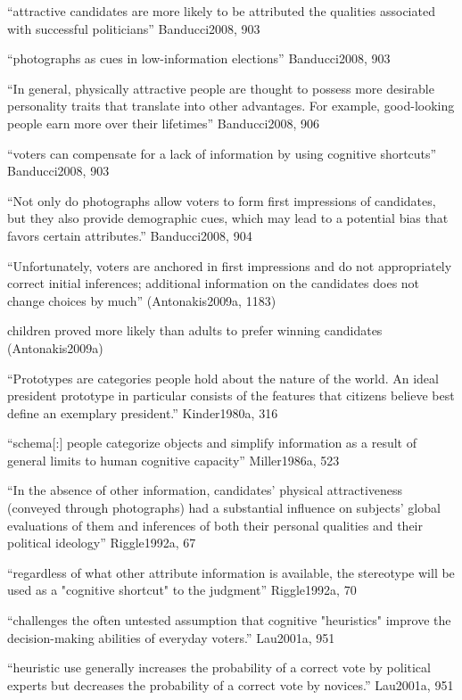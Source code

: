``attractive candidates are more likely to be attributed the qualities associated with successful politicians'' Banducci2008, 903

``photographs as cues in low-information elections'' Banducci2008, 903

``In general, physically attractive people are thought to possess more desirable
personality traits that translate into other advantages. For example, good-looking people earn more over their lifetimes'' Banducci2008, 906

``voters can compensate for a lack of information by using cognitive shortcuts'' Banducci2008, 903


	``Not only do photographs allow voters to form first impressions of candidates, but they also provide demographic cues, which may lead to a potential bias that favors certain attributes.'' Banducci2008, 904

	``Unfortunately, voters are anchored in first impressions and do not appropriately correct initial inferences; additional information on the candidates does not change choices by much'' (Antonakis2009a, 1183)

	children proved more likely than adults to prefer winning candidates (Antonakis2009a)

``Prototypes are categories people hold about the nature of the world. An ideal president prototype in particular consists of the features that citizens believe best define an exemplary president.'' Kinder1980a, 316

``schema[:] people categorize objects and simplify information as a result of general limits to human cognitive capacity'' Miller1986a, 523

``In the absence of other information, candidates' physical attractiveness (conveyed through photographs) had a substantial influence on subjects' global evaluations of them and inferences of both their personal qualities and their political ideology'' Riggle1992a, 67

``regardless of what other attribute information is available, the stereotype will be used as a "cognitive shortcut" to the judgment'' Riggle1992a, 70

``challenges the often untested assumption that cognitive "heuristics" improve the decision-making abilities of everyday voters.'' Lau2001a, 951

``heuristic use generally increases the probability of a correct vote by political experts but decreases the probability of a correct vote by novices.'' Lau2001a, 951

